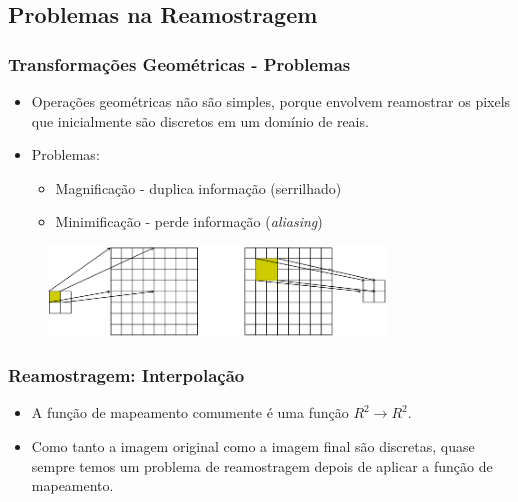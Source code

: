 \documentclass{beamer}
\begin{document}
\subsection{Problemas na Reamostragem}
\begin{frame}
\frametitle{Transformações Geométricas - Problemas}
\begin{itemize}
 \item Operações geométricas não são simples, porque envolvem reamostrar os
pixels que inicialmente são discretos em um domínio de reais.
 \item Problemas:
 \begin{itemize}
  \item Magnificação - duplica informação (serrilhado)
  \item Minimificação - perde informação (\textit{aliasing})
 \end{itemize}
\end{itemize}
\begin{figure}[ht!]
  \centering
  \includegraphics[width=0.8\textwidth]{img/resize.png}
\end{figure}
\end{frame}
\begin{frame}
  \frametitle{Reamostragem: Interpolação}
\begin{itemize}
 \item A função de mapeamento comumente é uma função $R^2 \rightarrow R^2$.
 \item Como tanto a imagem original como a imagem final são discretas, quase
sempre temos um problema de reamostragem depois de aplicar a função de
mapeamento.
\end{itemize}
\begin{center}
\end{center}
\end{frame}
\end{document}
